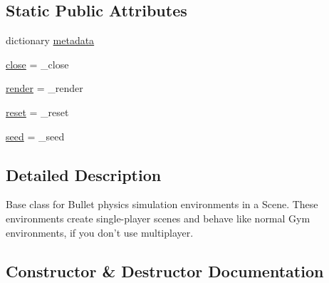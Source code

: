 \subsection*{Static Public Attributes}
\begin{DoxyCompactItemize}
\item 
dictionary \hyperlink{classpybullet-gym_1_1pybulletgym_1_1envs_1_1roboschool_1_1envs_1_1env__bases_1_1_base_bullet_env_a978eda350deeacabdbd781cf3bf0461b}{metadata}
\item 
\hyperlink{classpybullet-gym_1_1pybulletgym_1_1envs_1_1roboschool_1_1envs_1_1env__bases_1_1_base_bullet_env_a059ececf15c86cf0b5d51da281e91483}{close} = \+\_\+close
\item 
\hyperlink{classpybullet-gym_1_1pybulletgym_1_1envs_1_1roboschool_1_1envs_1_1env__bases_1_1_base_bullet_env_ad45933758f026b9c921a51d0e2247471}{render} = \+\_\+render
\item 
\hyperlink{classpybullet-gym_1_1pybulletgym_1_1envs_1_1roboschool_1_1envs_1_1env__bases_1_1_base_bullet_env_a92a1a1df8bc736d857665455d8167fd5}{reset} = \+\_\+reset
\item 
\hyperlink{classpybullet-gym_1_1pybulletgym_1_1envs_1_1roboschool_1_1envs_1_1env__bases_1_1_base_bullet_env_a66b7fb827d1f69094fa63c288ac8924c}{seed} = \+\_\+seed
\end{DoxyCompactItemize}


\subsection{Detailed Description}
\begin{DoxyVerb}Base class for Bullet physics simulation environments in a Scene.
These environments create single-player scenes and behave like normal Gym environments, if
you don't use multiplayer.
\end{DoxyVerb}
 

\subsection{Constructor \& Destructor Documentation}
